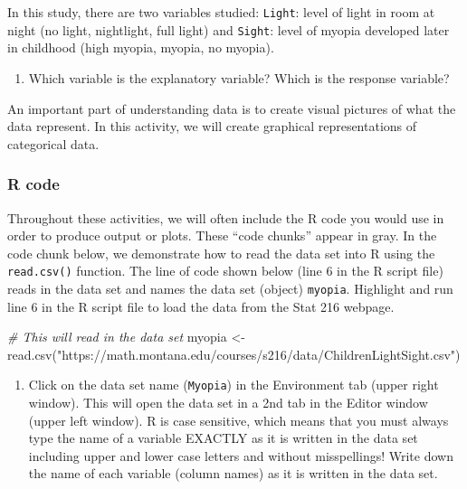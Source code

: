 \documentclass[
]{report}
\newenvironment{Shaded}{\begin{snugshade}}{\end{snugshade}}
\newcommand{\CommentTok}[1]{\textcolor[rgb]{0.56,0.35,0.01}{\textit{#1}}}
\newcommand{\FunctionTok}[1]{\textcolor[rgb]{0.00,0.00,0.00}{#1}}
\newcommand{\NormalTok}[1]{#1}
\newcommand{\OtherTok}[1]{\textcolor[rgb]{0.56,0.35,0.01}{#1}}
\newcommand{\StringTok}[1]{\textcolor[rgb]{0.31,0.60,0.02}{#1}}
\providecommand{\tightlist}{%
  \setlength{\itemsep}{0pt}\setlength{\parskip}{0pt}}
\begin{document}
In this study, there are two variables studied: \texttt{Light}: level of light in room at night (no light, nightlight, full light) and \texttt{Sight}: level of myopia developed later in childhood (high myopia, myopia, no myopia).

\begin{enumerate}
\def\labelenumi{\arabic{enumi}.}
\tightlist
\item
  Which variable is the explanatory variable? Which is the response variable?
\end{enumerate}

\vspace{0.8in}

An important part of understanding data is to create visual pictures of what the data represent. In this activity, we will create graphical representations of categorical data.

\hypertarget{r-code}{%
\subsubsection*{R code}\label{r-code}}

Throughout these activities, we will often include the R code you would use in order to produce output or plots. These ``code chunks'' appear in gray. In the code chunk below, we demonstrate how to read the data set into R using the \texttt{read.csv()} function. The line of code shown below (line 6 in the R script file) reads in the data set and names the data set (object) \texttt{myopia}. Highlight and run line 6 in the R script file to load the data from the Stat 216 webpage.

\begin{Shaded}
\begin{Highlighting}[]
\CommentTok{\# This will read in the data set}
\NormalTok{myopia }\OtherTok{\textless{}{-}} \FunctionTok{read.csv}\NormalTok{(}\StringTok{"https://math.montana.edu/courses/s216/data/ChildrenLightSight.csv"}\NormalTok{) }
\end{Highlighting}
\end{Shaded}

\begin{enumerate}
\def\labelenumi{\arabic{enumi}.}
\setcounter{enumi}{1}
\tightlist
\item
  Click on the data set name (\texttt{Myopia}) in the Environment tab (upper right window). This will open the data set in a 2nd tab in the Editor window (upper left window). R is case sensitive, which means that you must always type the name of a variable EXACTLY as it is written in the data set including upper and lower case letters and without misspellings! Write down the name of each variable (column names) as it is written in the data set.
\end{enumerate}
\end{document}
